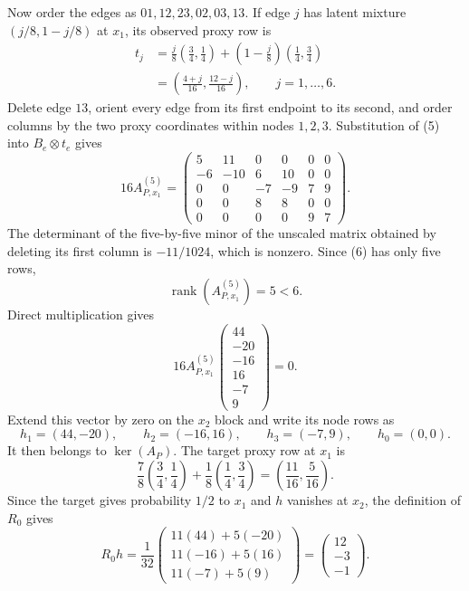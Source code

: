 Now order the edges as \(01,12,23,02,03,13\).  If edge \(j\) has latent mixture \((j/8,1-j/8)\) at \(x_1\), its observed proxy row is
\[
\begin{aligned}
t_j
&=\frac j8\left(\frac34,\frac14\right)
+\left(1-\frac j8\right)\left(\frac14,\frac34\right)\\
&=\left(\frac{4+j}{16},\frac{12-j}{16}\right),
\qquad j=1,\ldots,6.
\end{aligned}
\tag{5}
\]
Delete edge \(13\), orient every edge from its first endpoint to its second, and order columns by the two proxy coordinates within nodes \(1,2,3\).  Substitution of (5) into \(B_e\otimes t_e\) gives
\[
16A_{P,x_1}^{(5)}=
\begin{pmatrix}
5&11&0&0&0&0\\
-6&-10&6&10&0&0\\
0&0&-7&-9&7&9\\
0&0&8&8&0&0\\
0&0&0&0&9&7
\end{pmatrix}.
\tag{6}
\]
The determinant of the five-by-five minor of the unscaled matrix obtained by deleting its first column is \(-11/1024\), which is nonzero.  Since (6) has only five rows,
\[
\operatorname{rank}(A_{P,x_1}^{(5)})=5<6.
\tag{7}
\]
Direct multiplication gives
\[
16A_{P,x_1}^{(5)}
\begin{pmatrix}44\\-20\\-16\\16\\-7\\9\end{pmatrix}
=0.
\]
Extend this vector by zero on the \(x_2\) block and write its node rows as
\[
h_1=(44,-20),\qquad h_2=(-16,16),\qquad h_3=(-7,9),
\qquad h_0=(0,0).
\]
It then belongs to \(\ker(A_P)\).  The target proxy row at \(x_1\) is
\[
\frac78\left(\frac34,\frac14\right)
+\frac18\left(\frac14,\frac34\right)
=\left(\frac{11}{16},\frac5{16}\right).
\]
Since the target gives probability \(1/2\) to \(x_1\) and \(h\) vanishes at \(x_2\), the definition of \(R_0\) gives
\[
R_0h
=\frac1{32}
\begin{pmatrix}
11(44)+5(-20)\\
11(-16)+5(16)\\
11(-7)+5(9)
\end{pmatrix}
=\begin{pmatrix}12\\-3\\-1\end{pmatrix}.
\tag{8}
\]


